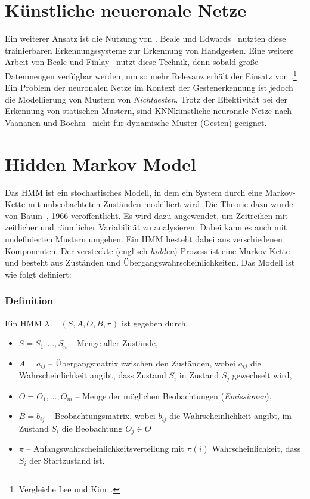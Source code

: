 \section{K\"unstliche neueronale Netze}
Ein weiterer Ansatz ist die Nutzung von . Beale und Edwards~\cite{bib:beale} nutzten diese trainierbaren Erkennungssysteme zur Erkennung von Handgesten. Eine weitere Arbeit von Beale und Finlay~\cite{bib:finlay} nutzt diese Technik, denn sobald gro\ss e Datenmengen verf\"ugbar werden, um so mehr Relevanz erh\"alt der Einsatz von .\footnote{Vergleiche Lee und Kim~\cite{bib:hmmlee}.}
\newline
Ein Problem der neuronalen Netze im Kontext der Gestenerkennung ist jedoch die Modellierung von Mustern von \textit{Nichtgesten}. Trotz der Effektivit\"at bei der Erkennung von statischen Mustern, sind \gls{KNN}{k\"unstliche neuronale Netze} nach Vaananen und Boehm~\cite{bib:vaananen} nicht f\"ur dynamische Muster (Gesten) geeignet.

\section{Hidden Markov Model}
Das \gls{HMM} ist ein stochastisches Modell, in dem ein System durch eine Markov-Kette mit unbeobachteten Zust\"anden modelliert wird. Die Theorie dazu wurde von Baum~\cite{bib:hmmbaum}, 1966 ver\"offentlicht.
\newline
Es wird dazu angewendet, um Zeitreihen mit zeitlicher und r\"aumlicher Variabilit\"at zu analysieren. Dabei kann es auch mit undefinierten Mustern umgehen. Ein \gls{HMM} besteht dabei aus verschiedenen Komponenten.
\newline
Der versteckte (englisch \textit{hidden}) Prozess ist eine Markov-Kette und besteht aus Zust\"anden und \"Ubergangswahrscheinlichkeiten.
Das Modell ist wie folgt definiert:

\subsubsection{Definition}
Ein \gls{HMM} $\lambda = (S, A, O, B, \pi)$ ist gegeben durch
\begin{itemize}
  \item $S = {S_1,\ldots,S_n}$ -- Menge aller Zust\"ande,
  \item $A = {a_{ij}}$ -- \"Ubergangsmatrix zwischen den Zust\"anden, wobei $a_{ij}$ die Wahrscheinlichkeit angibt, dass Zustand $S_i$ in Zustand $S_j$ gewechselt wird,
  \item $O = {O_1,\ldots,O_m}$ -- Menge der m\"oglichen Beobachtungen (\textit{Emissionen}),
  \item $B = {b_{ij}}$ -- Beobachtungsmatrix, wobei $b_{ij}$ die Wahrscheinlichkeit angibt, im Zustand $S_i$ die Beobachtung $O_j \in O$
  \item $\pi$ -- Anfangswahrscheinlichkeitsverteilung mit $\pi (i)$ Wahrscheinlichkeit, dass $S_i$ der Startzustand ist.
\end{itemize}

